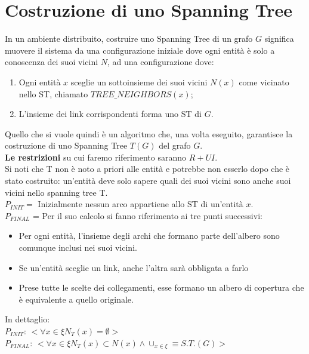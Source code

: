 \chapter{Costruzione di uno Spanning Tree}
In un ambiente distribuito, costruire uno Spanning Tree di un grafo $G$ significa
muovere il sistema da una configurazione iniziale dove ogni entità è solo a
conoscenza dei suoi vicini $N$, ad una configurazione dove:

\begin{enumerate}
    \item Ogni entità $x$ sceglie un sottoinsieme dei suoi vicini $N(x)$ come
          vicinato nello ST, chiamato $TREE\_NEIGHBORS(x)$;
    \item L'insieme dei link corrispondenti forma uno ST di $G$.
\end{enumerate}

Quello che si vuole quindi è un algoritmo che, una volta eseguito, garantisce la
costruzione di uno Spanning Tree $T(G)$ del grafo $G$.\\
\textbf{Le restrizioni} su cui faremo riferimento saranno $R+UI$.\\
Si noti che T non è noto a priori alle entità e potrebbe non esserlo dopo che è
stato costruito: un'entità deve solo sapere quali dei suoi vicini sono anche
suoi vicini nello spanning tree T.\\
$P_{INIT} = $ Inizialmente nessun arco appartiene allo ST di un'entità $x$.\\
$P_{FINAL}$ = Per il suo calcolo si fanno riferimento ai tre punti successivi:
\begin{itemize}
    \item Per ogni entità, l'insieme degli archi che formano parte dell'albero
          sono comunque inclusi nei suoi vicini.
    \item Se un'entità sceglie un link, anche l'altra sarà obbligata a farlo
    \item Prese tutte le scelte dei collegamenti, esse formano un albero di
          copertura che è equivalente a quello originale.
\end{itemize}
In dettaglio:\\
$P_{INIT}$: $< \forall x \in \xi N_T(x) = \emptyset >$\\
$P_{FINAL}$: $< \forall x \in \xi N_T(x) \subset N(x) \land \cup_{x \in \xi}
    \equiv S.T.(G)>$

